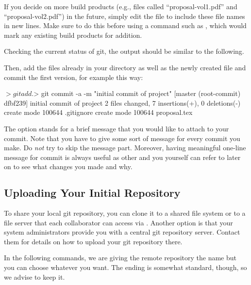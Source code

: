 If you decide on more build products (e.g., files called ``proposal-vol1.pdf'' and ``proposal-vol2.pdf'') in the future, simply edit the  file to include these file names in new lines.  Make sure to do this before using a command such as , which would mark any existing build products for addition.

Checking the current status of git, the output should be similar to the following.


Then, add the files already in your directory as well as the newly created file  and commit the first version, for example this way:
\begin{CodeVerbatim}
$> git add .
$> git commit -a -m "initial commit of project"
[master (root-commit) dfbf239] initial commit of project
 2 files changed, 7 insertions(+), 0 deletions(-)
 create mode 100644 .gitignore
 create mode 100644 proposal.tex
\end{CodeVerbatim}

The option  stands for a brief message that you would like to attach to your commit. Note that you have to give some sort of message for every commit you make. Do \textit{not} try to skip the message part. Moreover, having meaningful one-line message for commit is always useful as other and you yourself can refer to later on to see what changes you made and why.

\subsection{Uploading Your Initial Repository}\label{sec:upload-git}

To share your local git repository, you can clone it to a shared file system or to a file server that each collaborator can access via .  Another option is that your system administrators provide you with a central git repository server.  Contact them for details on how to upload your git repository there.

In the following commands, we are giving the remote repository the name  but you can choose whatever you want.  The ending  is somewhat standard, though, so we advise to keep it.  

